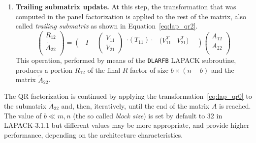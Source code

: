 \documentclass[runningheads]{llncs}
\begin{document}
\begin{enumerate}
\item {\bf Trailing submatrix update.} At this step, the
  transformation that was computed in the panel factorization is
  applied to the rest of the matrix, also called {\it trailing
    submatrix} as shown in Equation~\eqref{eq:lap_qr2}.
  \begin{equation}
    \label{eq:lap_qr2}
    \left(\begin{array}{c}
        R_{12}       \\
        \tilde{A}_{22}\\
      \end{array}\right) =
    \left(\begin{array}{c}
        \\
        \\
      \end{array}\right.  I - \left(\begin{array}{c}
        V_{11} \\
        V_{21}
      \end{array}\right) \begin{array}{c}
      \cdot (T_{11}) \cdot\\
      \\
    \end{array}   \begin{array}{cc}
      (V^T_{11}& V^T_{21}) \\
      &          \\
    \end{array}\left.\begin{array}{c}
        \\
        \\
      \end{array}\right)  \left(\begin{array}{c}
        A_{12}  \\
        A_{22}  \\
      \end{array}\right)
  \end{equation}
  This operation, performed by means of the \texttt{DLARFB} LAPACK
  subroutine, produces a portion $R_{12}$ of the final $R$ factor of
  size $b \times (n-b)$ and the matrix $\tilde{A}_{22}$.
\end{enumerate}
The QR factorization is continued by applying the
transformation~\eqref{eq:lap_qr0} to the submatrix $\tilde{A}_{22}$
and, then, iteratively, until the end of the matrix $A$ is reached. The
value of $b \ll m,n$ (the so called {\it block size}) is set by default to
32 in LAPACK-3.1.1 but different values may be more appropriate, and provide higher
performance, depending on the architecture characteristics.
\end{document}
